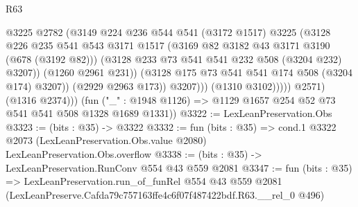\begin{lexlean}{R63}
\begin{coremodule}
                              @3225
                              @2782
                              (@3149
                                @224
                                @236
                                @544
                                @541
                                (@3172 @1517)
                                @3225
                                (@3128
                                  @226
                                  @235
                                  @541
                                  @543
                                  @3171
                                  @1517
                                  (@3169 @82 @3182 @43 @3171 @3190 (@678 (@3192 @82)))
                                  (@3128 @233 @73 @541 @541 @232 @508 (@3204 @232) @3207))
                                (@1260 @2961 @231))
                              (@3128 @175 @73 @541 @541 @174 @508 (@3204 @174) @3207))
                            (@2929 @2963 @173))
                          @3207)))
                    (@1310 @3102)))))
            @2571)
          (@1316 @2374)))
      (fun ("_" : @1948 @1126) => @1129 @1657 @254 @52 @73 @541 @541 @508 @1328 @1689 @1331))
@3322 := LexLeanPreservation.Obs
@3323 := (bits : @35) -> @3322
@3332 := fun (bits : @35) =>
  cond.{1} @3322 @2073 (LexLeanPreservation.Obs.value @2080) LexLeanPreservation.Obs.overflow
@3338 := (bits : @35) -> LexLeanPreservation.RunConv @554 @43 @559 @2081
@3347 := fun (bits : @35) =>
  LexLeanPreservation.run_of_funRel
    @554
    @43
    @559
    @2081
    (LexLeanPreserve.Cafda79c757163ffe4c6f07f487422bdf.R63.__rel_0 @496)
\end{coremodule}
\end{lexlean}
